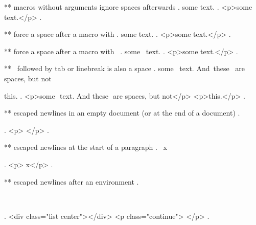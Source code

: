 ** macros without arguments ignore spaces afterwards
.
some \empty  text.
.
<p>some text.</p>
.


** force a space after a macro with {}
.
some \empty{} text.
.
<p>some ​ text.</p>
.


** force a space after a macro with \
.
some \empty\ text.
.
<p>some ​ text.</p>
.


** \ followed by tab or linebreak is also a space
.
some \empty\
text. And\	these
\
are spaces, but not\

this.
.
<p>some ​ text. And​ these ​ are spaces, but not​ </p>
<p>this.</p>
.


** escaped newlines in an empty document (or at the end of a document)
.
\


.
<p>​ </p>
.


** escaped newlines at the start of a paragraph
.
\
x

.
<p>​ x</p>
.


** escaped newlines after an environment
.
\begin{center}
\end{center}
\

.
<div class="list center"></div>
<p class="continue">​ </p>
.
